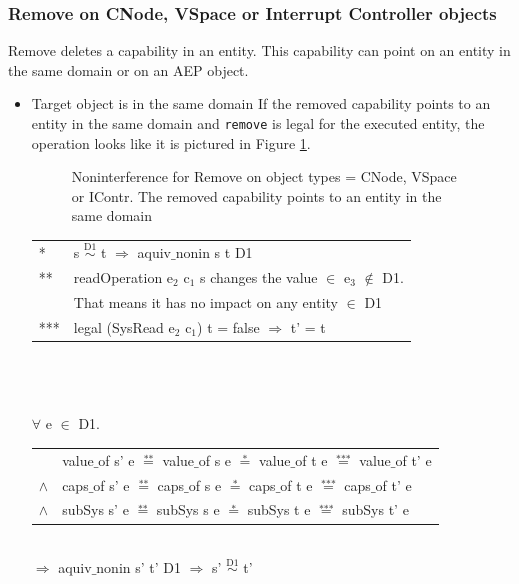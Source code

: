 \documentclass[pdftex,11pt,a4paper,twoside]{article}
\begin{document}
\subsubsection{Remove on CNode, VSpace or Interrupt Controller objects} 
Remove deletes a capability in an entity. This capability can point on an entity in the same domain or on an AEP object. 
\begin{itemize}
\item Target object is in the same domain
If the removed capability points to an entity in the same domain and  \texttt{remove} is legal for the executed entity, the operation looks like it is pictured in Figure \ref{fig:RemoveCNode}.
\begin{flushleft}
\begin{figure}[H]
\caption{Noninterference for Remove on object types = CNode, VSpace or IContr. The removed capability points to an entity in the same domain}
\label{fig:RemoveCNode}
\end{figure}
\end{flushleft}
\begin{tabular}{ll}
* & s $\overset{\text{D1}}{\sim}$ t $\Rightarrow$ aquiv$\_$nonin s t D1	\\ 
** & readOperation e$_2$ c$_1$ s changes the value $\in$ e$_3$ $\notin$ D1. \\
& That means it has no impact on any entity $\in$ D1 \\ 
*** & legal (SysRead e$_2$ c$_1$) t = false $\Rightarrow$ t' = t
\end{tabular} \\ \\ \\
$\forall$ e $\in$ D1. \\
\begin{tabular}{ll}
& value$\_$of s' e $\overset{\text{**}}{=}$ value$\_$of s e $\overset{\text{*}}{=}$ value$\_$of t e $\overset{\text{***}}{=}$ value$\_$of t' e \\
$\wedge$ & caps$\_$of s' e $\overset{\text{**}}{=}$ caps$\_$of s e $\overset{\text{*}}{=}$ caps$\_$of t e $\overset{\text{***}}{=}$ caps$\_$of t' e \\
$\wedge$ & subSys s' e $\overset{\text{**}}{=}$ subSys s e $\overset{\text{*}}{=}$ subSys t e $\overset{\text{***}}{=}$ subSys t' e
\end{tabular} \\
$\Rightarrow$ aquiv$\_$nonin s' t' D1 $\Rightarrow$ s' $\overset{\text{D1}}{\sim}$ t'
\end{itemize}
\end{document}

